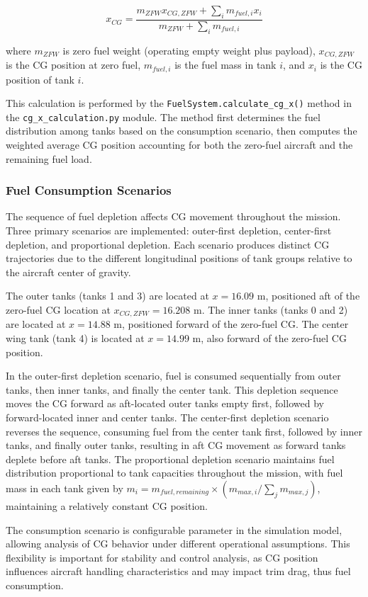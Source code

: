 \begin{equation}
x_{CG} = \frac{m_{ZFW} x_{CG,ZFW} + \sum_{i} m_{fuel,i} x_i}{m_{ZFW} + \sum_{i} m_{fuel,i}}
\end{equation}

where $m_{ZFW}$ is zero fuel weight (operating empty weight plus payload), $x_{CG,ZFW}$ is the CG position at zero fuel, $m_{fuel,i}$ is the fuel mass in tank $i$, and $x_i$ is the CG position of tank $i$.

This calculation is performed by the \texttt{FuelSystem.calculate\_cg\_x()} method in the \texttt{cg\_x\_calculation.py} module. The method first determines the fuel distribution among tanks based on the consumption scenario, then computes the weighted average CG position accounting for both the zero-fuel aircraft and the remaining fuel load.

\subsubsection{Fuel Consumption Scenarios}

The sequence of fuel depletion affects CG movement throughout the mission. Three primary scenarios are implemented: outer-first depletion, center-first depletion, and proportional depletion. Each scenario produces distinct CG trajectories due to the different longitudinal positions of tank groups relative to the aircraft center of gravity.

The outer tanks (tanks 1 and 3) are located at $x = 16.09$ m, positioned aft of the zero-fuel CG location at $x_{CG,ZFW} = 16.208$ m. The inner tanks (tanks 0 and 2) are located at $x = 14.88$ m, positioned forward of the zero-fuel CG. The center wing tank (tank 4) is located at $x = 14.99$ m, also forward of the zero-fuel CG position.

In the outer-first depletion scenario, fuel is consumed sequentially from outer tanks, then inner tanks, and finally the center tank. This depletion sequence moves the CG forward as aft-located outer tanks empty first, followed by forward-located inner and center tanks. The center-first depletion scenario reverses the sequence, consuming fuel from the center tank first, followed by inner tanks, and finally outer tanks, resulting in aft CG movement as forward tanks deplete before aft tanks. The proportional depletion scenario maintains fuel distribution proportional to tank capacities throughout the mission, with fuel mass in each tank given by $m_i = m_{fuel,remaining} \times (m_{max,i} / \sum_j m_{max,j})$, maintaining a relatively constant CG position.

The consumption scenario is configurable parameter in the simulation model, allowing analysis of CG behavior under different operational assumptions. This flexibility is important for stability and control analysis, as CG position influences aircraft handling characteristics and may impact trim drag, thus fuel consumption.
